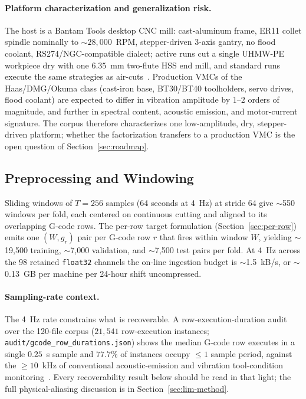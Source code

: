 \documentclass[sensors,article,submit,moreauthors,pdftex]{Definitions/mdpi}
\begin{document}
\paragraph{Platform characterization and generalization risk.} The host is a Bantam Tools desktop CNC mill: cast-aluminum frame, ER11 collet spindle nominally to $\sim 28{,}000$~RPM, stepper-driven 3-axis gantry, no flood coolant, RS274/NGC-compatible dialect; active runs cut a single UHMW-PE workpiece dry with one $6.35$~mm two-flute HSS end mill, and standard runs execute the same strategies as air-cuts~\cite{encoder_paper}. Production VMCs of the Haas/DMG/Okuma class (cast-iron base, BT30/BT40 toolholders, servo drives, flood coolant) are expected to differ in vibration amplitude by $1$--$2$ orders of magnitude, and further in spectral content, acoustic emission, and motor-current signature. The corpus therefore characterizes one low-amplitude, dry, stepper-driven platform; whether the factorization transfers to a production VMC is the open question of Section~\ref{sec:roadmap}.

\subsection{Preprocessing and Windowing}
\label{sec:preprocessing}

Sliding windows of $T=256$ samples (64 seconds at 4~Hz) at stride 64 give $\sim$550 windows per fold, each centered on continuous cutting and aligned to its overlapping G-code rows. The per-row target formulation (Section~\ref{sec:per-row}) emits one $(W, g_r)$ pair per G-code row $r$ that fires within window $W$, yielding $\sim$19{,}500 training, $\sim$7{,}000 validation, and $\sim$7{,}500 test pairs per fold. At 4~Hz across the 98 retained \texttt{float32} channels the on-line ingestion budget is $\sim$1.5~kB/s, or $\sim$0.13~GB per machine per 24-hour shift uncompressed.

\paragraph{Sampling-rate context.} The 4~Hz rate constrains what is recoverable. A row-execution-duration audit over the 120-file corpus ($21{,}541$ row-execution instances; \texttt{audit/gcode\_row\_durations.json}) shows the median G-code row executes in a single $0.25$~s sample and $77.7\%$ of instances occupy $\le\!1$ sample period, against the $\geq\!10$~kHz of conventional acoustic-emission and vibration tool-condition monitoring~\cite{teti2010advanced}. Every recoverability result below should be read in that light; the full physical-aliasing discussion is in Section~\ref{sec:lim-method}.
\end{document}
